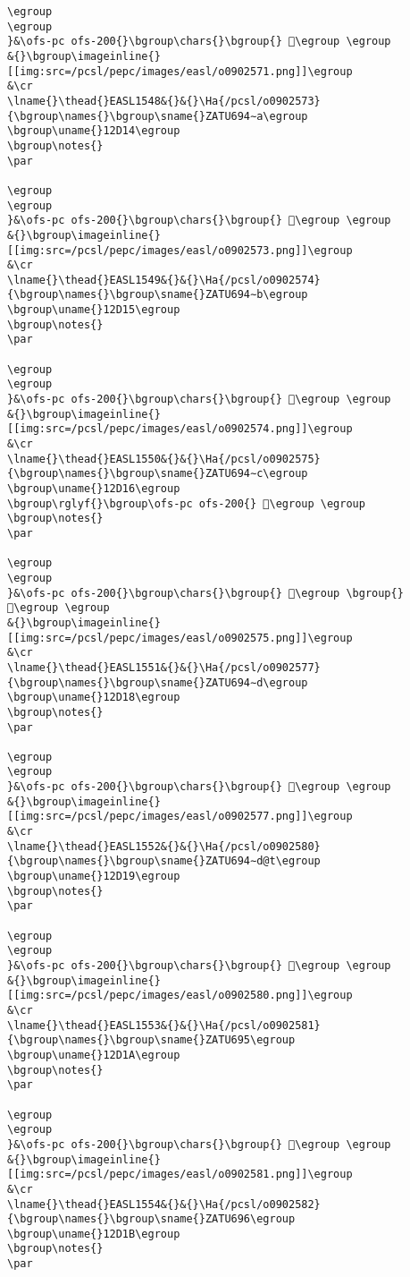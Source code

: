 \begin{verbatim}
\egroup
\egroup
}&\ofs-pc ofs-200{}\bgroup\chars{}\bgroup{} 𒴑\egroup \egroup
&{}\bgroup\imageinline{}[[img:src=/pcsl/pepc/images/easl/o0902571.png]]\egroup
&\cr
\lname{}\thead{}EASL1548&{}&{}\Ha{/pcsl/o0902573}{\bgroup\names{}\bgroup\sname{}ZATU694∼a\egroup
\bgroup\uname{}12D14\egroup
\bgroup\notes{}
\par 

\egroup
\egroup
}&\ofs-pc ofs-200{}\bgroup\chars{}\bgroup{} 𒴔\egroup \egroup
&{}\bgroup\imageinline{}[[img:src=/pcsl/pepc/images/easl/o0902573.png]]\egroup
&\cr
\lname{}\thead{}EASL1549&{}&{}\Ha{/pcsl/o0902574}{\bgroup\names{}\bgroup\sname{}ZATU694∼b\egroup
\bgroup\uname{}12D15\egroup
\bgroup\notes{}
\par 

\egroup
\egroup
}&\ofs-pc ofs-200{}\bgroup\chars{}\bgroup{} 𒴕\egroup \egroup
&{}\bgroup\imageinline{}[[img:src=/pcsl/pepc/images/easl/o0902574.png]]\egroup
&\cr
\lname{}\thead{}EASL1550&{}&{}\Ha{/pcsl/o0902575}{\bgroup\names{}\bgroup\sname{}ZATU694∼c\egroup
\bgroup\uname{}12D16\egroup
\bgroup\rglyf{}\bgroup\ofs-pc ofs-200{} 𒴖\egroup \egroup
\bgroup\notes{}
\par 

\egroup
\egroup
}&\ofs-pc ofs-200{}\bgroup\chars{}\bgroup{} 𒴖\egroup \bgroup{} 𒴗\egroup \egroup
&{}\bgroup\imageinline{}[[img:src=/pcsl/pepc/images/easl/o0902575.png]]\egroup
&\cr
\lname{}\thead{}EASL1551&{}&{}\Ha{/pcsl/o0902577}{\bgroup\names{}\bgroup\sname{}ZATU694∼d\egroup
\bgroup\uname{}12D18\egroup
\bgroup\notes{}
\par 

\egroup
\egroup
}&\ofs-pc ofs-200{}\bgroup\chars{}\bgroup{} 𒴘\egroup \egroup
&{}\bgroup\imageinline{}[[img:src=/pcsl/pepc/images/easl/o0902577.png]]\egroup
&\cr
\lname{}\thead{}EASL1552&{}&{}\Ha{/pcsl/o0902580}{\bgroup\names{}\bgroup\sname{}ZATU694∼d@t\egroup
\bgroup\uname{}12D19\egroup
\bgroup\notes{}
\par 

\egroup
\egroup
}&\ofs-pc ofs-200{}\bgroup\chars{}\bgroup{} 𒴙\egroup \egroup
&{}\bgroup\imageinline{}[[img:src=/pcsl/pepc/images/easl/o0902580.png]]\egroup
&\cr
\lname{}\thead{}EASL1553&{}&{}\Ha{/pcsl/o0902581}{\bgroup\names{}\bgroup\sname{}ZATU695\egroup
\bgroup\uname{}12D1A\egroup
\bgroup\notes{}
\par 

\egroup
\egroup
}&\ofs-pc ofs-200{}\bgroup\chars{}\bgroup{} 𒴚\egroup \egroup
&{}\bgroup\imageinline{}[[img:src=/pcsl/pepc/images/easl/o0902581.png]]\egroup
&\cr
\lname{}\thead{}EASL1554&{}&{}\Ha{/pcsl/o0902582}{\bgroup\names{}\bgroup\sname{}ZATU696\egroup
\bgroup\uname{}12D1B\egroup
\bgroup\notes{}
\par 


\end{verbatim}
